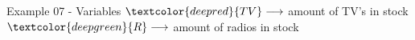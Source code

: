 \begin{frame}{Example 07 - Variables}
\LARGE{
$\textcolor{deepred}  {TV} \longrightarrow$
    amount of TV's in stock \\ \vspace{1cm}
$\textcolor{deepgreen}{R}  \longrightarrow$
    amount of radios in stock
}
\end{frame}
